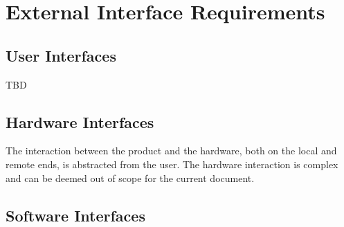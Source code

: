 \documentclass{scrreprt}
\begin{document}
\chapter{External Interface Requirements}

\section{User Interfaces}

TBD

\section{Hardware Interfaces}

The interaction between the product and the hardware, both on the local and remote ends, is abstracted from the user. The hardware interaction is complex and can be deemed out of scope for the current document.

\section{Software Interfaces}
\end{document}
